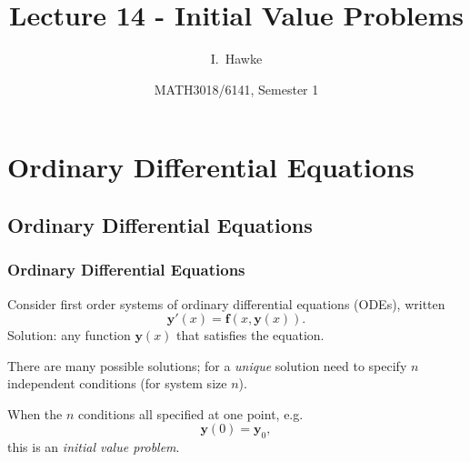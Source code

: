 \documentclass{beamer}
\title[Lecture 14] %
{Lecture 14 - Initial Value Problems}
\author[I. Hawke] %
{I.~Hawke}
\institute[University of Southampton] %
{
  School of Mathematics, \\
  University of Southampton, UK
}
\date[Semester 1] %
{MATH3018/6141, Semester 1}
\newcommand{\by}{{\boldsymbol{y}}}
\newcommand{\bfm}[1]{{\boldsymbol{#1}}}
\begin{document}
\begin{frame}
  \titlepage
\end{frame}

\section{Ordinary Differential Equations}

\subsection{Ordinary Differential Equations}

\begin{frame}
  \frametitle{Ordinary Differential Equations}

  Consider first order systems of ordinary differential
  equations (ODEs), written
  \begin{equation*}
    \by'(x) = \bfm{f}(x, \by(x)).
  \end{equation*}
  Solution: any function $\by(x)$ that satisfies the equation. \pause

  \vspace{1ex}

  There are many possible solutions; for a \emph{unique} solution need
  to specify $n$ independent conditions (for system size $n$). \pause

  \vspace{1ex}

  When the $n$ conditions all specified at one point, e.g.
  \begin{equation*}
    \by(0) = \by_0,
  \end{equation*}
  this is an \emph{initial value problem}.

\end{frame}
\end{document}
